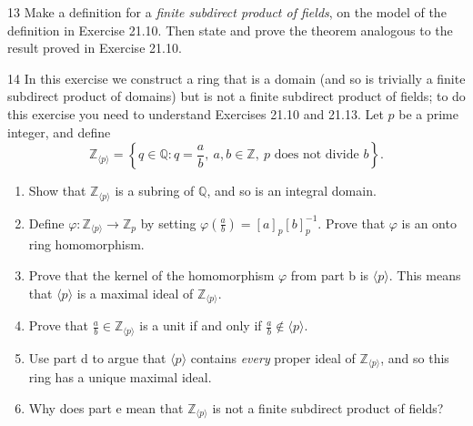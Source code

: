 \begin{problem}{13}
    Make a definition for a \emph{finite subdirect product of fields}, on the model of the
    definition in Exercise 21.10. Then state and prove the theorem analogous to the result
    proved in Exercise 21.10.
\end{problem}
\unsolved

\begin{problem}{14}
    In this exercise we construct a ring that is a domain (and so is trivially a finite
    subdirect product of domains) but is not a finite subdirect product of fields; to do
    this exercise you need to understand Exercises 21.10 and 21.13. Let $p$ be a prime
    integer, and define
    \[\mathbb{Z}_{\langle p \rangle} = \left\{q \in \mathbb{Q} : q = \frac{a}{b},\ a, b \in \mathbb{Z},\ p \text{ does not divide } b\right\}.\]
    \begin{enumerate}
        \item[(a)] Show that $\mathbb{Z}_{\langle p \rangle}$ is a subring of $\mathbb{Q}$,
        and so is an integral domain.
        \item[(b)] Define $\varphi : \mathbb{Z}_{\langle p \rangle} \to \mathbb{Z}_p$ by
        setting $\varphi(\frac{a}{b}) = [a]_p{[b]}_p^{-1}$. Prove that $\varphi$ is an onto
        ring homomorphism.
        \item[(c)] Prove that the kernel of the homomorphism $\varphi$ from part b is
        $\langle p \rangle$. This means that $\langle p \rangle$ is a maximal ideal of
        $\mathbb{Z}_{\langle p \rangle}$.
        \item[(d)] Prove that $\frac{a}{b} \in \mathbb{Z}_{\langle p \rangle}$ is a unit if
        and only if $\frac{a}{b} \notin \langle p \rangle$.
        \item[(e)] Use part d to argue that $\langle p \rangle$ contains \emph{every} proper
        ideal of $\mathbb{Z}_{\langle p \rangle}$, and so this ring has a unique maximal
        ideal.
        \item[(f)] Why does part e mean that $\mathbb{Z}_{\langle p \rangle}$ is not a
        finite subdirect product of fields?
    \end{enumerate}
\end{problem}
\unsolved
